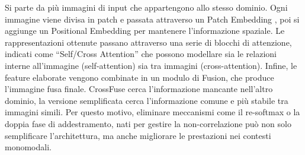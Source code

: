 Si parte da più immagini di input che appartengono allo stesso dominio.
Ogni immagine viene divisa in patch e passata attraverso un Patch Embedding , poi si aggiunge un Positional Embedding per mantenere l’informazione spaziale.
Le rappresentazioni ottenute passano attraverso una serie di blocchi di attenzione, indicati come “Self/Cross Attention” che possono modellare sia le relazioni interne all’immagine (self-attention) sia tra immagini (cross-attention).
Infine, le feature elaborate vengono combinate in un modulo di Fusion, che produce l’immagine fusa finale.
CrossFuse cerca l’informazione mancante nell’altro dominio, la versione semplificata cerca l’informazione comune e più stabile tra immagini simili.
Per questo motivo, eliminare meccanismi come il re-softmax o la doppia fase di addestramento, nati per gestire la non-correlazione 
può non solo semplificare l’architettura, ma anche migliorare le prestazioni nei contesti monomodali.



 

